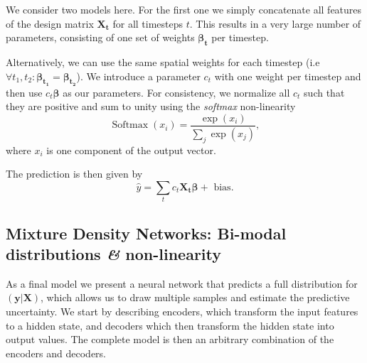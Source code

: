 \documentclass[nobib, a4paper]{tufte-handout}
\begin{document}
We consider two models here.
For the first one we simply concatenate all features of the design matrix \(\bm{X_t}\) for all timesteps \(t\).
This results in a very large number of parameters, consisting of one set of weights \(\bm{\beta_t}\) per timestep.

Alternatively, we can use the same spatial weights for each timestep (i.e\ \( \forall t_1, t_2: \bm{\beta_{t_1}} = \bm{\beta_{t_2}}\)).
We introduce a parameter \(c_t\) with one weight per timestep and then use $c_t \bm{\beta}$ as our parameters.
For consistency, we normalize all \(c_t\) such that they are positive and sum to unity using the \textit{softmax} non-linearity
\begin{equation}\label{eq:softmax}
\operatorname{Softmax} (x_i) = \frac{\exp (x_i)}{\sum_j \exp (x_j)},
\end{equation}
where \(x_i\) is one component of the output vector.

The prediction is then given by
\begin{equation*}
  \hat{y} = \sum_t c_t \bm{X_t} \bm{\beta} + \text{ bias}.
\end{equation*}

\subsection{Mixture Density Networks: Bi-modal distributions \textit{\&} non-linearity}
As a final model we present a neural network that predicts a full distribution for \(\left( \bm{y} | \bm{X}\right)\), which allows us to draw multiple samples and estimate the predictive uncertainty.
We start by describing encoders, which transform the input features to a hidden state, and decoders which then transform the hidden state into output values.
The complete model is then an arbitrary combination of the encoders and decoders.
\end{document}
